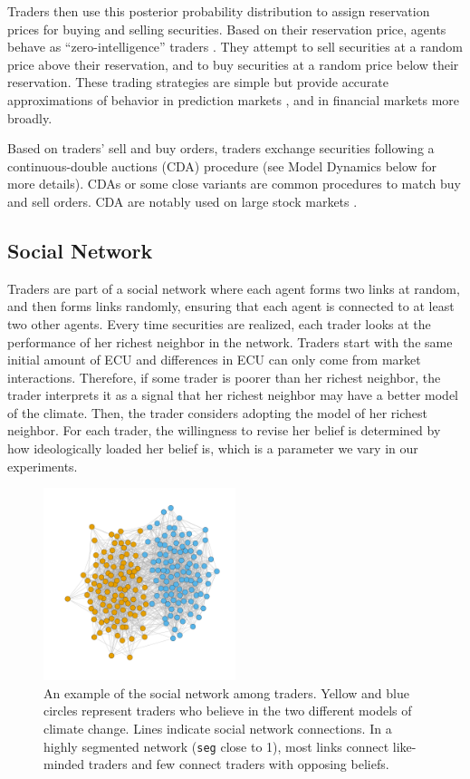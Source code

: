 \documentclass{wscpaperproc}\usepackage[]{graphicx}\usepackage[]{color}
\begin{document}
Traders then use this posterior probability distribution to assign reservation prices for buying and selling securities. 
Based on their reservation price, agents behave as ``zero-intelligence'' traders .
They attempt to sell securities at a random price above their reservation, and to buy securities at a random price below their reservation.
These trading strategies are simple but provide accurate approximations of behavior in prediction markets , and in financial markets more broadly.

Based on traders' sell and buy orders, traders exchange securities following a continuous-double auctions (CDA) procedure (see Model Dynamics below for more details). 
CDAs or some close variants are common procedures to match buy and sell orders. 
CDA are notably used on large stock markets .
 
\subsection{Social Network}

Traders are part of a social network where each agent forms two links at random, and then forms links randomly, ensuring that each agent is connected to at least two other agents. 
Every time securities are realized, each trader looks at the performance of her richest neighbor in the network. 
Traders start with the same initial amount of ECU and differences in ECU can only come from market interactions.
Therefore, if some trader is poorer than her richest neighbor, the trader interprets it as a signal that her richest neighbor may have a better model of the climate.
Then, the trader considers adopting the model of her richest neighbor. 
For each trader, the willingness to revise her belief is determined by how ideologically loaded her belief is, which is a parameter we vary in our experiments.

\begin{figure}[t]
\begin{center}
\includegraphics[width=0.50\textwidth]{output/network.pdf}
\caption{An example of the social network among traders. Yellow and blue circles represent traders who believe in the two different models of climate change. Lines indicate social network connections. In a highly segmented network (\texttt{seg} close to 1), most links connect like-minded traders and few connect traders with opposing beliefs.}\label{fig:social_network}%
\end{center}
\end{figure}
\end{document}
